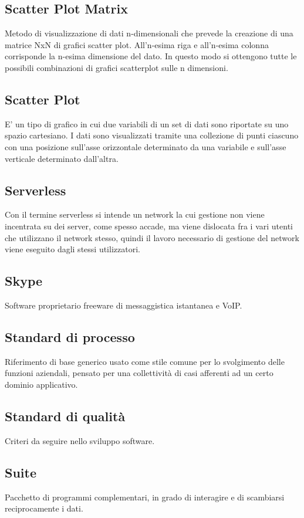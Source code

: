 \documentclass[../glossario.tex]{subfiles}
\begin{document}
\subsection*{Scatter Plot Matrix}
Metodo di visualizzazione di dati n-dimensionali che prevede la creazione di una matrice NxN di grafici scatter plot. All’n-esima riga e all’n-esima colonna corrisponde la n-esima dimensione del dato. In questo modo si ottengono tutte le possibili combinazioni di grafici scatterplot sulle n dimensioni.

\subsection*{Scatter Plot} 
E' un tipo di grafico in cui due variabili di un set di dati sono riportate su uno spazio cartesiano. I dati sono visualizzati tramite una collezione di punti ciascuno con una posizione sull'asse orizzontale determinato da una variabile e sull'asse verticale determinato dall'altra.


\subsection*{Serverless} 
Con il termine serverless si intende un network la cui gestione non viene incentrata su dei server, come spesso accade, ma viene dislocata fra i vari utenti che utilizzano il network stesso, quindi il lavoro necessario di gestione del network viene eseguito dagli stessi utilizzatori.

\subsection*{Skype} 
Software proprietario freeware di messaggistica istantanea e VoIP.

\subsection*{Standard di processo} 
Riferimento di base generico usato come stile comune per lo svolgimento delle funzioni aziendali, pensato per una collettività di casi afferenti ad un certo dominio applicativo.

\subsection*{Standard di qualità} 
Criteri da seguire nello sviluppo software.


\subsection*{Suite} 
Pacchetto di programmi complementari, in grado di interagire e di scambiarsi reciprocamente i dati.

    
\end{document}
